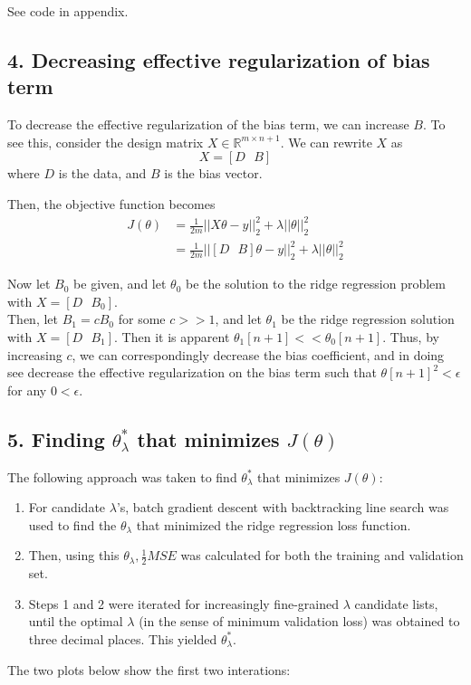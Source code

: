 \documentclass[paper=a4, fontsize=11pt]{scrartcl} %
\numberwithin{equation}{section} %
\numberwithin{figure}{section} %
\numberwithin{table}{section} %
\begin{document}
See code in appendix.

\subsection*{4. Decreasing effective regularization of bias term}

To decrease the effective regularization of the bias term, we can increase $B$. To see this, consider the design matrix $X \in \mathbb{R}^{m \times n + 1}$. We can rewrite $X$ as
\[X = \left[D \textrm{  } B \right] \]
where $D$ is the data, and $B$ is the bias vector.

Then, the objective function becomes
\begin{align*}
J(\theta) &= \frac{1}{2m} ||X \theta - y||_2^2 + \lambda ||\theta||_2^2 \\
	&= \frac{1}{2m} || \left[D \textrm{  } B \right] \theta - y||_2^2 + \lambda ||\theta||_2^2
\end{align*}

Now let $B_0$ be given, and let $\theta_0$ be the solution to the ridge regression problem with $X = \left[D \textrm{  } B_0 \right]$.\\

Then, let $B_1 = cB_0$ for some $c >> 1$, and let $\theta_1$ be the ridge regression solution with $X = \left[D \textrm{  } B_1 \right]$. Then it is apparent $\theta_1[n+1] << \theta_0[n+1]$. Thus, by increasing $c$, we can correspondingly decrease the bias coefficient, and in doing see decrease the effective regularization on the bias term such that $\theta[n+1]^2 < \epsilon$ for any $0 < \epsilon$.

\subsection*{5. Finding $\theta_{\lambda}^*$ that minimizes $J(\theta)$}

The following approach was taken to find $\theta_{\lambda}^*$ that minimizes $J(\theta)$:
\begin{enumerate}
\item For candidate $\lambda$'s, batch gradient descent with backtracking line search was used to find the $\theta_{\lambda}$ that minimized the ridge regression loss function.
\item Then, using this $\theta_{\lambda}, \frac{1}{2} MSE$ was calculated for both the training and validation set.
\item Steps 1 and 2 were iterated for increasingly fine-grained $\lambda$ candidate lists, until the optimal $\lambda$ (in the sense of minimum validation loss) was obtained to three decimal places. This yielded $\theta_{\lambda}^*$.
\end{enumerate}
The two plots below show the first two interations:
\end{document}
